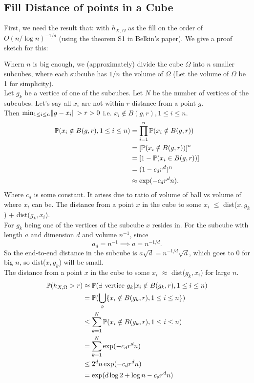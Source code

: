 \documentclass[twoside]{memoir}
\begin{document}
\subsection{Fill Distance of points in a Cube}
First, we need the result that: with $h_{X,\Omega}$ as the fill on the order of $O(n/\log n)^{-1/d}$ (using the theorem S1 in Belkin's paper). We give a proof sketch for this:

Whern $n$ is big enough, we (approximately) divide the cube $\Omega$ into $n$ smaller subcubes, where each subcube has $1/n$ the volume of $\Omega$ (Let the volume of $\Omega$ be 1 for simplicity).\\
Let $g_k$ be a vertice of one of the subcubes. Let $N$ be the number of vertices of the subcubes.
Let's say all $x_i$ are not within $r$ distance from a point $g$.\\ Then $\min_{1 \leq i \leq n} \lVert g - x_i\rVert > r > 0 $ i.e. 
$x_i \notin B(g, r), 1\leq i\leq n$.
\begin{equation*}
\begin{split}
\mathbb{P}(x_i \notin B(g, r), 1\leq i\leq n) &= \prod_{i=1}^{n} \mathbb{P}(x_i \notin B(g, r)) \\
&= [\mathbb{P}(x_i \notin B(g, r))]^n \\
&= [1 - \mathbb{P}(x_i \in B(g, r))] \\
&= (1 - c_d r^d)^n \\
&\approx \exp(-c_d r^d n). 
\end{split}
\end{equation*}
Where $c_d$ is some constant. It arises due to ratio of volume of ball vs volume of where $x_i$ can be.
The distance from a point $x$ in the cube to some $x_i$ $\leq$ dist($x, g_k$) + dist($g_k, x_i$).\\
For $g_k$ being one of the vertices of the subcube $x$ resides in. For the subcube with length $a$ and dimension $d$ and volume $n^{-1}$, since 
\[ a_d = n^{-1} \implies a = n^{-1/d}. \]
So the end-to-end distance in the subcube is $a\sqrt{d} = n^{-1/d}\sqrt{d}$, which goes to 0 for big $n$, so dist($x, g_k$) will be small.\\
The distance from a point $x$ in the cube to some $x_i$ $\approx$ dist($g_k, x_i$) for large $n$.
\begin{equation*}
\begin{split}
\mathbb{P}(h_{X,\Omega} > r) &\approx \mathbb{P}(\exists \text{ vertice } g_k | x_i \notin B(g_k, r), 1\leq i\leq n)\\
&= \mathbb{P}(\bigcup_{k} \{ x_i \notin B(g_k, r), 1 \leq i \leq n\} ) \\
&\leq \sum_{k=1}^{N}\mathbb{P}(x_i \notin B(g_k, r), 1 \leq i \leq n) \\
&= \sum_{k=1}^{N} \exp(-c_d r^d n)\\
&\leq 2^d n \exp(-c_d r^d n)\\
&= \exp(d\log 2+\log n - c_d r^d n )
\end{split}
\end{equation*}
\end{document}
